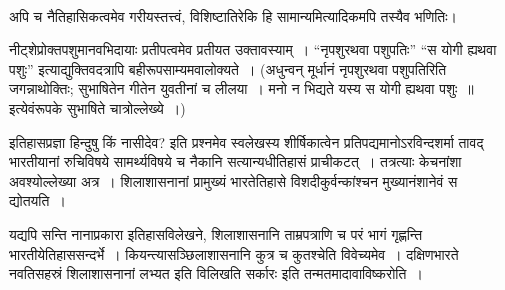 \vskip 3pt

\begin{myquote}

~\hfill {}
\end{myquote}

\vskip 3pt

अपि च नैतिहासिकत्वमेव गरीयस्तत्त्वं, विशिष्टातिरेकि हि सामान्यमित्यादिकमपि तस्यैव भणितिः।

\vskip 3pt

नीट्शेप्रोक्तपशुमानवभिदायाः प्रतीपत्वमेव प्रतीयत उक्तावस्याम्~। “नृपशुरथवा पशुपतिः” “स योगी ह्यथवा पशुः” इत्याद्युक्तिवदत्रापि बहीरूपसाम्यमवालोक्यते~। (अधुन्वन् मूर्धानं नृपशुरथवा पशुपतिरिति जगन्नाथोक्तिः; सुभाषितेन गीतेन युवतीनां च लीलया~। मनो न भिद्यते यस्य स योगी ह्यथवा पशुः~॥ इत्येवंरूपके सुभाषिते चात्रोल्लेख्ये~।)

\vskip 3pt

इतिहासप्रज्ञा हिन्दुषु किं नासीदेव? इति प्रश्नमेव स्वलेखस्य शीर्षिकात्वेन प्रतिपद्यमानोऽरविन्दशर्मा  तावद् भारतीयानां रुचिविषये सामर्थ्यविषये च नैकानि सत्यान्यधीतिहासं प्राचीकटत्~। तत्रत्याः केचनांशा अवश्योल्लेख्या अत्र~। शिलाशासनानां प्रामुख्यं भारतेतिहासे विशदीकुर्वन्कांश्चन मुख्यानंशानेवं स द्योतयति~।

\vskip 3pt

यद्यपि सन्ति नानाप्रकारा इतिहासविलेखने, शिलाशासनानि ताम्रपत्राणि च परं भागं गृह्णन्ति भारतीयेतिहाससन्दर्भे~। कियन्त्यासञ्छिलाशासनानि कुत्र च कुतश्चेति विवेच्यमेव~। दक्षिणभारते नवतिसहस्रं शिलाशासनानां लभ्यत इति विलिखति सर्कारः  इति तन्मतमादावाविष्करोति~।

\vskip 3pt

\begin{myquote}

~\hfill {}
\end{myquote}

